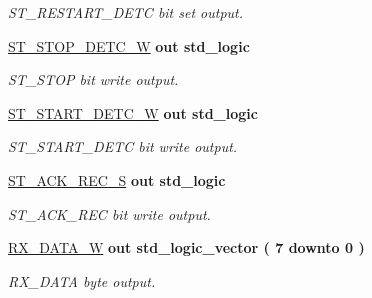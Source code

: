 \begin{DoxyCompactItemize}
\begin{DoxyCompactList}\small\item\em S\+T\+\_\+\+R\+E\+S\+T\+A\+R\+T\+\_\+\+D\+E\+TC bit set output. \end{DoxyCompactList}\item 
\hyperlink{classi2c__master__engine_a3204ed6ce253b4b911f2929d6c36c890}{S\+T\+\_\+\+S\+T\+O\+P\+\_\+\+D\+E\+T\+C\+\_\+W}  {\bfseries {\bfseries \textcolor{vhdlchar}{out}\textcolor{vhdlchar}{ }}} {\bfseries \textcolor{vhdlchar}{std\+\_\+logic}\textcolor{vhdlchar}{ }} 
\begin{DoxyCompactList}\small\item\em S\+T\+\_\+\+S\+T\+OP bit write output. \end{DoxyCompactList}\item 
\hyperlink{classi2c__master__engine_a0ec71b35aa301ece71deb8c72d8dca5d}{S\+T\+\_\+\+S\+T\+A\+R\+T\+\_\+\+D\+E\+T\+C\+\_\+W}  {\bfseries {\bfseries \textcolor{vhdlchar}{out}\textcolor{vhdlchar}{ }}} {\bfseries \textcolor{vhdlchar}{std\+\_\+logic}\textcolor{vhdlchar}{ }} 
\begin{DoxyCompactList}\small\item\em S\+T\+\_\+\+S\+T\+A\+R\+T\+\_\+\+D\+E\+TC bit write output. \end{DoxyCompactList}\item 
\hyperlink{classi2c__master__engine_addd7ad0c235e85c4aa614edb71019430}{S\+T\+\_\+\+A\+C\+K\+\_\+\+R\+E\+C\+\_\+S}  {\bfseries {\bfseries \textcolor{vhdlchar}{out}\textcolor{vhdlchar}{ }}} {\bfseries \textcolor{vhdlchar}{std\+\_\+logic}\textcolor{vhdlchar}{ }} 
\begin{DoxyCompactList}\small\item\em S\+T\+\_\+\+A\+C\+K\+\_\+\+R\+EC bit write output. \end{DoxyCompactList}\item 
\hyperlink{classi2c__master__engine_a82c1b89857b443652ea136d1ce7d95dd}{R\+X\+\_\+\+D\+A\+T\+A\+\_\+W}  {\bfseries {\bfseries \textcolor{vhdlchar}{out}\textcolor{vhdlchar}{ }}} {\bfseries \textcolor{vhdlchar}{std\+\_\+logic\+\_\+vector}\textcolor{vhdlchar}{ }\textcolor{vhdlchar}{(}\textcolor{vhdlchar}{ }\textcolor{vhdlchar}{ } \textcolor{vhdldigit}{7} \textcolor{vhdlchar}{ }\textcolor{vhdlchar}{downto}\textcolor{vhdlchar}{ }\textcolor{vhdlchar}{ } \textcolor{vhdldigit}{0} \textcolor{vhdlchar}{ }\textcolor{vhdlchar}{)}\textcolor{vhdlchar}{ }} 
\begin{DoxyCompactList}\small\item\em R\+X\+\_\+\+D\+A\+TA byte output. \end{DoxyCompactList}\end{DoxyCompactItemize}


